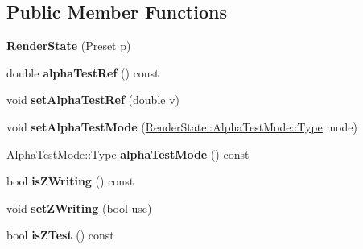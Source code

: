 \subsection*{Public Member Functions}
\begin{DoxyCompactItemize}
\item 
\hypertarget{class_tempest_1_1_render_state_a4b6f5463e7e3f3288dfba965afba38a0}{{\bfseries Render\+State} (Preset p)}\label{class_tempest_1_1_render_state_a4b6f5463e7e3f3288dfba965afba38a0}

\item 
\hypertarget{class_tempest_1_1_render_state_af5e877e3b7ba3b492b6c4eecbd5ea74d}{double {\bfseries alpha\+Test\+Ref} () const }\label{class_tempest_1_1_render_state_af5e877e3b7ba3b492b6c4eecbd5ea74d}

\item 
\hypertarget{class_tempest_1_1_render_state_a889078f887aa3256dbb400d9276383c7}{void {\bfseries set\+Alpha\+Test\+Ref} (double v)}\label{class_tempest_1_1_render_state_a889078f887aa3256dbb400d9276383c7}

\item 
\hypertarget{class_tempest_1_1_render_state_ae7fe929e405717af6c3fc52e40cc621d}{void {\bfseries set\+Alpha\+Test\+Mode} (\hyperlink{struct_tempest_1_1_render_state_1_1_alpha_test_mode_adce96ba2d2ef19eacfee189daee26fe9}{Render\+State\+::\+Alpha\+Test\+Mode\+::\+Type} mode)}\label{class_tempest_1_1_render_state_ae7fe929e405717af6c3fc52e40cc621d}

\item 
\hypertarget{class_tempest_1_1_render_state_a02958ad56f346439d9018dbf5a5a09f0}{\hyperlink{struct_tempest_1_1_render_state_1_1_alpha_test_mode_adce96ba2d2ef19eacfee189daee26fe9}{Alpha\+Test\+Mode\+::\+Type} {\bfseries alpha\+Test\+Mode} () const }\label{class_tempest_1_1_render_state_a02958ad56f346439d9018dbf5a5a09f0}

\item 
\hypertarget{class_tempest_1_1_render_state_ad7495f790024aa30c238b64c07909e38}{bool {\bfseries is\+Z\+Writing} () const }\label{class_tempest_1_1_render_state_ad7495f790024aa30c238b64c07909e38}

\item 
\hypertarget{class_tempest_1_1_render_state_aa9f3acfca2d4a031cf3a2623e324d440}{void {\bfseries set\+Z\+Writing} (bool use)}\label{class_tempest_1_1_render_state_aa9f3acfca2d4a031cf3a2623e324d440}

\item 
\hypertarget{class_tempest_1_1_render_state_a3d5f31b6dea6dacf34129af2c4110c08}{bool {\bfseries is\+Z\+Test} () const }\label{class_tempest_1_1_render_state_a3d5f31b6dea6dacf34129af2c4110c08}


\end{DoxyCompactItemize}
